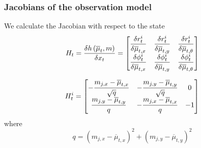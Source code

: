     \begin{frame}
     \frametitle{Jacobians of the observation model}
     We calculate the Jacobian with respect to the state
     \begin{equation*}
     H_{t} = \dfrac{\delta h\left( \overline{\mu}_{t},m \right)}{\delta x_{t}} =
     \begin{bmatrix}
     \dfrac{\delta r_{t}^{i}}{\delta \overline{\mu}_{t,x}} & \dfrac{\delta r_{t}^{i}}{\delta \overline{\mu}_{t,y}} & \dfrac{\delta r_{t}^{i}}{\delta \overline{\mu}_{t,\theta}}\\
     \dfrac{\delta \phi _{t}^{i}}{\delta \overline{\mu}_{t,x}} & \dfrac{\delta \phi _{t}^{i}}{\delta \overline{\mu}_{t,y}} & \dfrac{\delta \phi _{t}^{i}}{\delta \overline{\mu}_{t,\theta}}
     \end{bmatrix}
     \end{equation*}
    
     \begin{equation*}
     H_{t}^{i} =
     \begin{bmatrix}
     -\dfrac{m_{j,x} - \overline{\mu}_{t,x}}{\sqrt{q}} & -\dfrac{m_{j,y} - \overline{\mu}_{t,y}}{\sqrt{q}} & 0\\
     \dfrac{m_{j,y} - \overline{\mu}_{t,y}}{q} & -\dfrac{m_{j,x} - \overline{\mu}_{t,x}}{q} & -1
     \end{bmatrix}
     \end{equation*}
     where
     \begin{equation*}
     q = (m_{j,x}-\overline{\mu}_{t,x})^{2} + (m_{j,y}-\overline{\mu}_{t,y})^{2}
     \end{equation*}
\end{frame}

